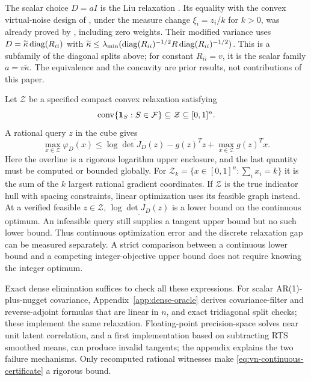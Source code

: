 The scalar choice $D=aI$ is the Liu relaxation
\citep[Section II.B]{Liu2016}. Its equality with the convex virtual-noise
design of \citet{Pazman2022}, under the measure change $\xi_i=z_i/k$ for
$k>0$, was already proved by \citet[Proposition 3]{Hainy2025}, including
zero weights. Their modified variance uses
$D=\widetilde\kappa\operatorname{diag}(R_{ii})$ with
$\widetilde\kappa\le\lambda_{\min}(\operatorname{diag}(R_{ii})^{-1/2}
R\operatorname{diag}(R_{ii})^{-1/2})$. This is a subfamily of the diagonal splits above;
for constant $R_{ii}=v$, it is the scalar family $a=v\widetilde\kappa$.
The equivalence and the concavity are prior results, not contributions of
this paper.

Let $\mathcal Z$ be a specified compact convex relaxation satisfying
\[
 \operatorname{conv}\{\mathbf 1_S:S\in\mathcal F\}
 \subseteq\mathcal Z\subseteq[0,1]^n.
\]
A rational query $z$ in the cube gives
\begin{equation}\label{eq:vn-continuous-certificate}
 \max_{x\in\mathcal Z}\varphi_D(x)
 \le \overline{\log\det J_D(z)}-g(z)^Tz
       +\max_{x\in\mathcal Z}g(z)^Tx.
\end{equation}
Here the overline is a rigorous logarithm upper enclosure, and the last
quantity must be computed or bounded globally. For
$\mathcal Z_k=\{x\in[0,1]^n:\sum_i x_i=k\}$ it is the sum of the $k$
largest rational gradient coordinates. If $\mathcal Z$ is the true indicator
hull with spacing constraints, linear optimization uses its feasible graph
instead. At a verified feasible $z\in\mathcal Z$,
$\underline{\log\det J_D(z)}$ is a lower bound on the continuous optimum.
An infeasible query still supplies a tangent upper bound but no such lower
bound. Thus continuous optimization error and the discrete relaxation gap
can be measured separately. A strict comparison between a continuous lower
bound and a competing integer-objective upper bound does not require knowing
the integer optimum.

Exact dense elimination suffices to check all these expressions. For scalar
AR(1)-plus-nugget covariance, Appendix~\ref{app:dense-oracle} derives
covariance-filter and reverse-adjoint formulas that are linear in $n$, and
exact tridiagonal split checks; these implement the same relaxation.
Floating-point precision-space solves near unit latent correlation, and a
first implementation based on subtracting RTS smoothed means, can produce
invalid tangents; the appendix explains the two failure mechanisms.
Only recomputed rational witnesses make \eqref{eq:vn-continuous-certificate}
a rigorous bound.

